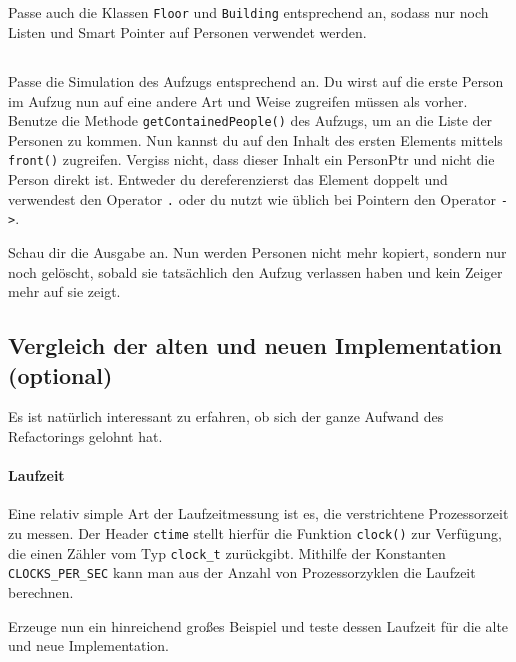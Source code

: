 \subsection{}
Passe auch die Klassen \texttt{Floor} und \texttt{Building} entsprechend an, sodass nur noch Listen und Smart Pointer auf Personen verwendet werden.

\subsection{}
Passe die Simulation des Aufzugs entsprechend an.
Du wirst auf die erste Person im Aufzug nun auf eine andere Art und Weise zugreifen müssen als vorher.
Benutze die Methode \texttt{getContainedPeople()} des Aufzugs, um an die Liste der Personen zu kommen.
Nun kannst du auf den Inhalt des ersten Elements mittels \texttt{front()} zugreifen.
Vergiss nicht, dass dieser Inhalt ein PersonPtr und nicht die Person direkt ist.
Entweder du dereferenzierst das Element doppelt und verwendest den Operator \texttt{.} oder du nutzt wie üblich bei Pointern den Operator \texttt{->}.

Schau dir die Ausgabe an.
Nun werden Personen nicht mehr kopiert, sondern nur noch gelöscht, sobald sie tatsächlich den Aufzug verlassen haben und kein Zeiger mehr auf sie zeigt.

\subsection{Vergleich der alten und neuen Implementation (optional)}

Es ist natürlich interessant zu erfahren, ob sich der ganze Aufwand des Refactorings gelohnt hat.

\paragraph{Laufzeit}
Eine relativ simple Art der Laufzeitmessung ist es, die verstrichtene Prozessorzeit zu messen.
Der Header \texttt{ctime} stellt hierfür die Funktion \texttt{clock()} zur Verfügung, die einen Zähler vom Typ \texttt{clock\_t} zurückgibt.
Mithilfe der Konstanten \texttt{CLOCKS\_PER\_SEC} kann man aus der Anzahl von Prozessorzyklen die Laufzeit berechnen.

Erzeuge nun ein hinreichend großes Beispiel und teste dessen Laufzeit für die alte und neue Implementation.



